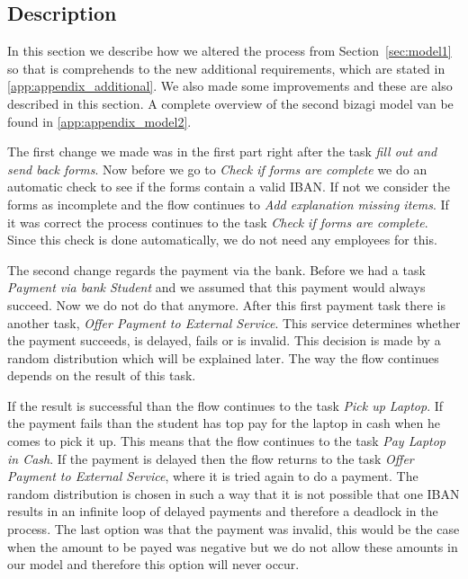 
\subsection{Description}
In this section we describe how we altered the process from Section~\ref{sec:model1} so that is comprehends to the new additional requirements, which are stated in \autoref{app:appendix_additional}.
We also made some improvements and these are also described in this section.
A complete overview of the second bizagi model van be found in \autoref{app:appendix_model2}.

The first change we made was in the first part right after the task \emph{fill out and send back forms}.
Now before we go to \emph{Check if forms are complete} we do an automatic check to see if the forms contain a valid IBAN.
If not we consider the forms as incomplete and the flow continues to \emph{Add explanation missing items}.
If it was correct the process continues to the task \emph{Check if forms are complete}. Since this check is done automatically, we do not need any employees for this.

The second change regards the payment via the bank. Before we had a task \emph{Payment via bank Student} and we assumed that this payment would always succeed.
Now we do not do that anymore. After this first payment task there is another task, \emph{Offer Payment to External Service}.
This service determines whether the payment succeeds, is delayed, fails or is invalid.
This decision is made by a random distribution which will be explained later.
The way the flow continues depends on the result of this task.

If the result is successful than the flow continues to the task \emph{Pick up Laptop}.
If the payment fails than the student has top pay for the laptop in cash when he comes to pick it up.
This means that the flow continues to the task \emph{Pay Laptop in Cash}.
If the payment is delayed then the flow returns to the task \emph{Offer Payment to External Service}, where it is tried again to do a payment.
The random distribution is chosen in such a way that it is not possible that one IBAN results in an infinite loop of delayed payments and therefore a deadlock in the process.
The last option was that the payment was invalid, this would be the case when the amount to be payed was negative but we do not allow these amounts in our model and therefore this option will never occur.

